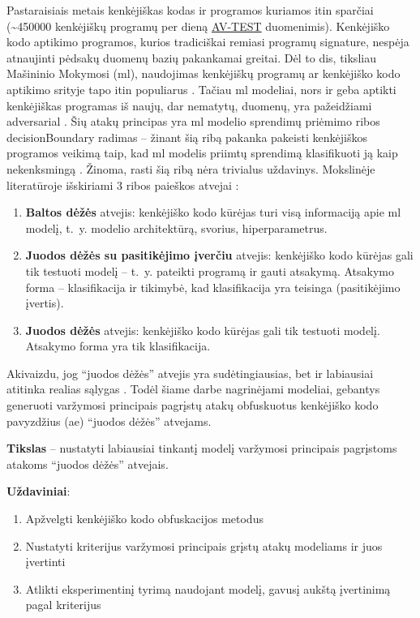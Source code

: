 
Pastaraisiais metais kenkėjiškas kodas ir programos kuriamos itin sparčiai (\sim450000 kenkėjiškų programų per dieną \href{https://www.av-test.org/en/statistics/malware/}{AV-TEST} duomenimis). Kenkėjiško kodo aptikimo programos, kurios tradiciškai remiasi programų \gls{signature}, nespėja atnaujinti pėdsakų duomenų bazių pakankamai greitai. Dėl to \acfp{di}, tiksliau Mašininio Mokymosi (\acs{ml}), naudojimas kenkėjiškų programų ar kenkėjiško kodo aptikimo srityje tapo itin populiarus \cite{demetrioAdversarialEXEmplesSurvey2021}. Tačiau \ac{ml} modeliai, nors ir geba aptikti kenkėjiškas programas iš naujų, dar nematytų, duomenų, yra pažeidžiami \gls{adversarial} \cite{castroAIMEDEvolvingMalware2019,huGeneratingAdversarialMalware2017,rosenbergGenericBlackBoxEndEnd2018,zhongReinforcementLearningBased2022}. Šių atakų principas yra \ac{ml} modelio sprendimų priėmimo ribos \gls{decisionBoundary} radimas -- žinant šią ribą pakanka pakeisti kenkėjiškos programos veikimą taip, kad \ac{ml} modelis priimtų sprendimą klasifikuoti ją kaip nekenksmingą \cite{demetrioAdversarialEXEmplesSurvey2021}. Žinoma, rasti šią ribą nėra trivialus uždavinys. Mokslinėje literatūroje išskiriami 3 ribos paieškos atvejai \cite{fangEvadingMalwareEngines2019}:
\begin{enumerate}
    \item \textbf{Baltos dėžės} atvejis: kenkėjiško kodo kūrėjas turi visą informaciją apie \ac{ml} modelį, t.~y. modelio architektūrą, svorius, hiperparametrus.
    \item \textbf{Juodos dėžės su pasitikėjimo įverčiu} atvejis: kenkėjiško kodo kūrėjas gali tik testuoti modelį -- t.~y. pateikti programą ir gauti atsakymą. Atsakymo forma -- klasifikacija ir tikimybė, kad klasifikacija yra teisinga (pasitikėjimo įvertis).
    \item \textbf{Juodos dėžės} atvejis: kenkėjiško kodo kūrėjas gali tik testuoti modelį. Atsakymo forma yra tik klasifikacija.
\end{enumerate}
Akivaizdu, jog \enquote{juodos dėžės} atvejis yra sudėtingiausias, bet ir labiausiai atitinka realias sąlygas \citeplace. Todėl šiame darbe nagrinėjami modeliai, gebantys generuoti varžymosi principais pagrįstų atakų obfuskuotus kenkėjiško kodo pavyzdžius (\acs{ae}) \enquote{juodos dėžės} atvejams.

\vspace{10pt}
\textbf{Tikslas} -- nustatyti labiausiai tinkantį modelį varžymosi principais pagrįstoms atakoms \enquote{juodos dėžės} atvejais.

\vspace{10pt}
\textbf{Uždaviniai}:
\begin{enumerate}
    \item Apžvelgti kenkėjiško kodo obfuskacijos metodus
    \item Nustatyti kriterijus varžymosi principais grįstų atakų modeliams ir juos įvertinti
    \item Atlikti eksperimentinį tyrimą naudojant modelį, gavusį aukštą įvertinimą pagal kriterijus
\end{enumerate}